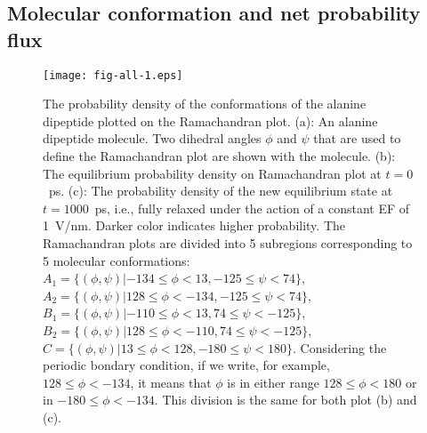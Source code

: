 \documentclass[a4paper,preprint,unsortedaddress,onecolumn]{revtex4-1}
\newcommand{\recheck}[1]{{\color{red} #1}}
\begin{document}
\subsection{Molecular conformation and net probability flux}

\begin{figure}
  \centering
  \texttt{[image: fig-all-1.eps]}
  \caption{
    \recheck{
    The probability density of the conformations of the alanine dipeptide plotted on the Ramachandran plot.
    (a): An alanine dipeptide molecule.  Two dihedral angles
    $\phi$ and $\psi$ that are used to define the Ramachandran plot
    are shown with the molecule.
    (b): The equilibrium probability density on Ramachandran plot
    at $t=0$~\textsf{ps}. (c): The probability density of the new equilibrium
    state at $t=1000$~\textsf{ps}, i.e., fully relaxed under the
    action of a constant EF of 1~V/nm.  Darker color
    indicates higher probability.
    The Ramachandran plots are divided into 5 subregions corresponding
    to 5 molecular conformations:
    $A_1 = \{(\phi, \psi) | -134 \leq \phi <  13, -125 \leq \psi < 74\}$,
    $A_2 = \{(\phi, \psi) |  128 \leq \phi <-134, -125 \leq \psi < 74\}$,
    $B_1 = \{(\phi, \psi) | -110 \leq \phi <  13,   74 \leq \psi <-125\}$,
    $B_2 = \{(\phi, \psi) |  128 \leq \phi <-110,   74 \leq \psi <-125\}$,
    $C   = \{(\phi, \psi) |   13 \leq \phi < 128, -180 \leq \psi < 180\}$.
    Considering the periodic bondary condition, if we write, for example,
    $128 \leq \phi <-134$, it means that $\phi$ is in either range
    $128 \leq \phi < 180$ or in $-180 \leq \phi < -134$.
    This division is the same for both plot (b) and (c).
    }
  }
  \label{fig:tmp4}
\end{figure}
\end{document}
